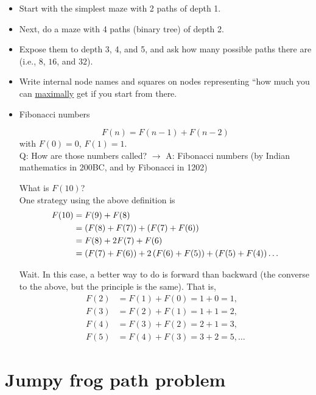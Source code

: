 \documentclass[a4paper, 12pt]{article}
\begin{document}
\begin{itemize}

\item Start with the simplest maze with 2 paths of depth 1.

\item Next, do a maze with 4 paths (binary tree) of depth 2.

\item Expose them to depth 3, 4, and 5, and ask how many possible paths there are (i.e., $8$, $16$, and $32$).

\item Write internal node names and squares on nodes representing ``how much you can \underline{maximally} get if you start from there.

\item Fibonacci numbers

\begin{equation}
F(n) = F(n-1)+F(n-2)
\end{equation}
with $F(0) = 0$, $F(1) = 1$.\\
Q: How are those numbers called? $\to$ A: Fibonacci numbers (by Indian mathematics in 200BC, and by Fibonacci in 1202)

What is $F(10)$?\\
One strategy using the above definition is
\begin{align}
F(10) &= F(9) + F(8) \notag \\
%
&= \left( F(8) +F(7) \right) + \left( F(7) + F(6) \right) \notag \\
%
&= F(8) + 2 F(7) + F(6) \notag \\
%
&= \left( F(7) + F(6) \right) + 2 \left( F(6) + F(5) \right) + \left( F(5) + F(4) \right) \ldots
\end{align}

Wait. In this case, a better way to do is forward than backward (the converse to the above, but the principle is the same). That is,
\begin{align}
F(2) &= F(1) + F(0) = 1 + 0 = 1,\\
F(3) &= F(2) + F(1) = 1 + 1 = 2,\\
F(4) &= F(3) + F(2) = 2 + 1 = 3,\\
F(5) &= F(4) + F(3) = 3 + 2 = 5, \ldots
\end{align}

\end{itemize}

\section{Jumpy frog path problem}
\end{document}
